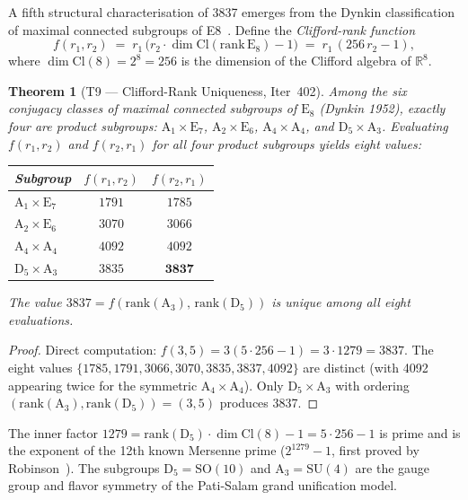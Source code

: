 \documentclass[aps,prd,twocolumn,superscriptaddress,floatfix,nofootinbib]{revtex4-2}
\newtheorem{theorem}{Theorem}
\theoremstyle{definition}
\theoremstyle{remark}
\begin{document}
A fifth structural characterisation of 3837 emerges from the Dynkin classification of
maximal connected subgroups of E8~\cite{dynkin1952}.  Define the \emph{Clifford-rank
function}
\begin{equation}
  f(r_1, r_2) \;=\; r_1\,\bigl(r_2\cdot\dim\mathrm{Cl}(\mathrm{rank}\,\mathrm{E}_8) - 1\bigr)
             \;=\; r_1\,(256\,r_2 - 1),
  \label{eq:clifford-rank}
\end{equation}
where $\dim\mathrm{Cl}(8) = 2^8 = 256$ is the dimension of the Clifford algebra of $\mathbb{R}^8$.

\begin{theorem}[T9 --- Clifford-Rank Uniqueness, Iter~402]
Among the six conjugacy classes of maximal connected subgroups of $\mathrm{E}_8$
(Dynkin 1952), exactly four are product subgroups: $\mathrm{A}_1\times\mathrm{E}_7$,
$\mathrm{A}_2\times\mathrm{E}_6$, $\mathrm{A}_4\times\mathrm{A}_4$, and
$\mathrm{D}_5\times\mathrm{A}_3$.  Evaluating $f(r_1,r_2)$ and $f(r_2,r_1)$ for all
four product subgroups yields eight values:
\begin{center}
\begin{tabular}{lcc}
\toprule
Subgroup & $f(r_1,r_2)$ & $f(r_2,r_1)$ \\
\midrule
$\mathrm{A}_1\times\mathrm{E}_7$ & $1791$ & $1785$ \\
$\mathrm{A}_2\times\mathrm{E}_6$ & $3070$ & $3066$ \\
$\mathrm{A}_4\times\mathrm{A}_4$ & $4092$ & $4092$ \\
$\mathrm{D}_5\times\mathrm{A}_3$ & $3835$ & $\mathbf{3837}$ \\
\bottomrule
\end{tabular}
\end{center}
The value $3837 = f(\mathrm{rank}(\mathrm{A}_3),\,\mathrm{rank}(\mathrm{D}_5))$ is
\emph{unique} among all eight evaluations.
\end{theorem}
\begin{proof}
Direct computation: $f(3,5) = 3(5\cdot 256 - 1) = 3\cdot 1279 = 3837$.  The eight values
$\{1785, 1791, 3066, 3070, 3835, 3837, 4092\}$ are distinct (with 4092 appearing twice for
the symmetric $\mathrm{A}_4\times\mathrm{A}_4$).  Only $\mathrm{D}_5\times\mathrm{A}_3$
with ordering $(\mathrm{rank}(\mathrm{A}_3),\mathrm{rank}(\mathrm{D}_5)) = (3,5)$
produces 3837.
\end{proof}

The inner factor $1279 = \mathrm{rank}(\mathrm{D}_5)\cdot\dim\mathrm{Cl}(8) - 1 = 5\cdot 256 - 1$
is prime and is the exponent of the 12th known Mersenne prime ($2^{1279}-1$, first proved by
Robinson~\cite{robinson1952}).  The subgroups $\mathrm{D}_5 = \mathrm{SO}(10)$ and
$\mathrm{A}_3 = \mathrm{SU}(4)$ are the gauge group and flavor symmetry of the Pati-Salam
grand unification model.
\end{document}
